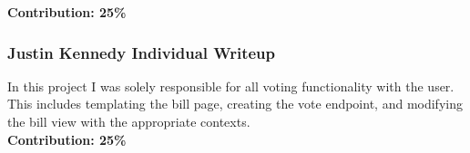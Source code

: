 \documentclass{article}
\newcommand{\n}{\noindent}
\begin{document}
\n\textbf{Contribution: 25\%}

\pagebreak

\subsubsection*{Justin Kennedy Individual Writeup}

In this project I was solely responsible for all voting functionality with the user.  This includes templating the bill page, creating the vote endpoint, and modifying the bill view with the appropriate contexts.\\

\n\textbf{Contribution: 25\%}
\end{document}
